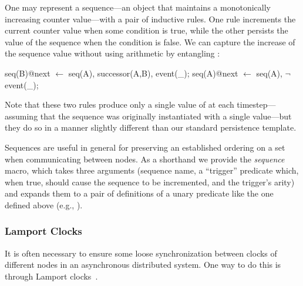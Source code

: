One may represent a sequence---an object that maintains a monotonically
increasing counter value---with a pair of inductive rules.  One rule
increments the current counter value when some condition is true, while the
other persists the value of the sequence when the condition is false.  We can
capture the increase of the sequence value without using arithmetic by
entangling :

\begin{Dedalus}
seq(B)@next \(\leftarrow\) seq(A), successor(A,B), event(_);  
seq(A)@next \(\leftarrow\) seq(A), \(\lnot\)event(_);
\end{Dedalus}

\noindent Note that these two rules produce only a single value of
 at each timestep---assuming that the sequence was originally
instantiated with a single value---but they do so in a manner slightly
different than our standard persistence template.

Sequences are useful in general for preserving an established ordering on a set
when communicating between nodes.  As a shorthand we provide the {\em sequence}
macro, which takes three arguments (sequence name, a ``trigger'' predicate
which, when true, should cause the sequence to be incremented, and the
trigger's arity) and expands them to a pair of definitions of a unary predicate
like the one defined above (e.g., ).

\subsubsection{Lamport Clocks}
\label{sec:lamport}
It is often necessary to ensure some loose synchronization between clocks of
different nodes in an asynchronous distributed system.  One way to do this is
through Lamport clocks~\cite{timeclocks}.

